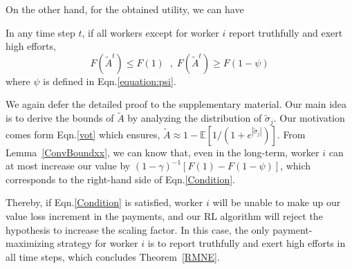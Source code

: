 On the other hand, for the obtained utility, we can have 
\begin{lemma}
\label{ConvBoundxx}
In any time step $t$, if all workers except for worker $i$ report truthfully and exert high efforts,
\begin{equation*}
F(\tilde{A}^t)\leq F(1) \;\;,\; F(\tilde{A}^t)\geq F(1-\psi)
\end{equation*}
where $\psi$ is defined in Eqn.\ref{equation:psi}.
\end{lemma}
We again defer the detailed proof to the supplementary material.
Our main idea is to derive the bounds of $\tilde{A}$ by analyzing the distribution of $\tilde{\sigma}_j$.
Our motivation comes form Eqn.\ref{vot} which ensures, $\tilde{A} \approx 1-\mathbb{E}[1/(1+e^{|\tilde{\sigma}_j|})]$. From Lemma~\ref{ConvBoundxx}, we can know that, even in the long-term, worker $i$ can at most increase our value by $(1-\gamma)^{-1}[F(1)-F(1-\psi)]$, which corresponds to the right-hand side of Eqn.\ref{Condition}.

Thereby, if Eqn.\ref{Condition} is satisfied, worker $i$ will be unable to make up our value loss increment in the payments, and our RL algorithm will reject the hypothesis to increase the scaling factor.
In this case, the only payment-maximizing strategy for worker $i$ is to report truthfully and exert high efforts in all time steps, which concludes Theorem~\ref{RMNE}.

